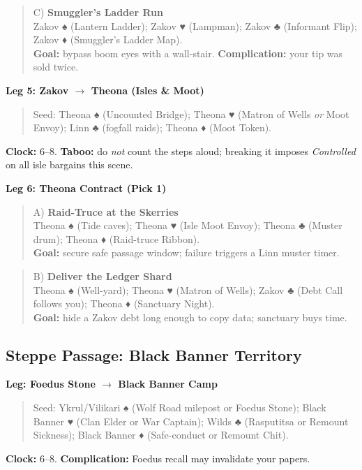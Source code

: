 \documentclass[12pt,oneside]{book}
\renewcommand{\spadesuit}{♠}
\renewcommand{\heartsuit}{♥}
\renewcommand{\clubsuit}{♣}
\renewcommand{\diamondsuit}{♦}
\begin{document}
\begin{quote}
C) \textbf{Smuggler's Ladder Run}\\
Zakov \spadesuit{} (Lantern Ladder); Zakov \heartsuit{} (Lampman); Zakov \clubsuit{} (Informant Flip); Zakov \diamondsuit{} (Smuggler's Ladder Map).\\
\textbf{Goal:} bypass boom eyes with a wall-stair. \textbf{Complication:} your tip was sold twice.
\end{quote}

\textbf{Leg 5: Zakov $\rightarrow$ Theona (Isles \& Moot)}
\begin{quote}
Seed: Theona \spadesuit{} (Uncounted Bridge); Theona \heartsuit{} (Matron of Wells \emph{or} Moot Envoy); Linn \clubsuit{} (fogfall raids); Theona \diamondsuit{} (Moot Token).
\end{quote}
\textbf{Clock:} 6--8. \textbf{Taboo:} do \emph{not} count the steps aloud; breaking it imposes \emph{Controlled} on all isle bargains this scene.

\textbf{Leg 6: Theona Contract (Pick 1)}
\begin{quote}
A) \textbf{Raid-Truce at the Skerries}\\
Theona \spadesuit{} (Tide caves); Theona \heartsuit{} (Isle Moot Envoy); Theona \clubsuit{} (Muster drum); Theona \diamondsuit{} (Raid-truce Ribbon).\\
\textbf{Goal:} secure safe passage window; failure triggers a Linn muster timer.
\end{quote}

\begin{quote}
B) \textbf{Deliver the Ledger Shard}\\
Theona \spadesuit{} (Well-yard); Theona \heartsuit{} (Matron of Wells); Zakov \clubsuit{} (Debt Call follows you); Theona \diamondsuit{} (Sanctuary Night).\\
\textbf{Goal:} hide a Zakov debt long enough to copy data; sanctuary buys time.
\end{quote}

\subsection{Steppe Passage: Black Banner Territory}

\textbf{Leg: Foedus Stone $\rightarrow$ Black Banner Camp}
\begin{quote}
Seed: Ykrul/Vilikari \spadesuit{} (Wolf Road milepost or Foedus Stone); Black Banner \heartsuit{} (Clan Elder or War Captain); Wilds \clubsuit{} (Rasputitsa or Remount Sickness); Black Banner \diamondsuit{} (Safe-conduct or Remount Chit).
\end{quote}
\textbf{Clock:} 6--8. \textbf{Complication:} Foedus recall may invalidate your papers.
\end{document}
